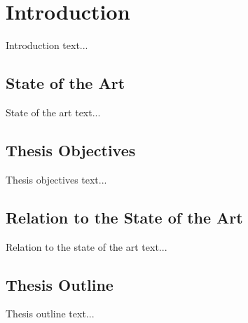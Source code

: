 \chapter{Introduction} \label{chap:introduction}
Introduction text...

\section{State of the Art} \label{sec:state_of_the_art}
State of the art text... \citep{article:perceptron} \citep{article:pruning_algorithms}

\section{Thesis Objectives} \label{sec:thesis_objectives}
Thesis objectives text...

\section{Relation to the State of the Art} \label{sec:relation_to_the_state_of_the_art}
Relation to the state of the art text...

\section{Thesis Outline} \label{sec:thesis_outline}
Thesis outline text...